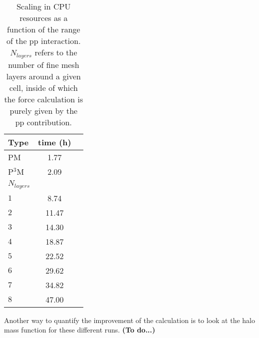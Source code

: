 \begin{table}
\begin{center}
\caption{Scaling in {\small CPU} resources as a function of the range of the pp interaction.
$N_{layers}$ refers to the number of fine mesh layers around a given cell, inside of which the force calculation
is purely given by the pp contribution. }
\begin{tabular}{|l|c|c|}
\hline 
             Type         & time (h)   \\
                  \hline
PM                         & 1.77 \\
P$^{3}$M             & 2.09 \\
\hline
$N_{layers}$       &          \\
\hline
 $1$ & 8.74 \\
 $2$ & 11.47\\
 $3$ & 14.30 \\
 $4$ & 18.87\\
 $5$ & 22.52\\
 $6$ & 29.62\\
 $7$ & 34.82\\
 $8$ & 47.00\\
 

\hline \hline
\end{tabular}
\label{table:cpu_pp_ext}
\end{center}
\end{table}

Another way to quantify the improvement of the calculation is to look at the halo mass function for these different runs.
{\bf (To do...)}
